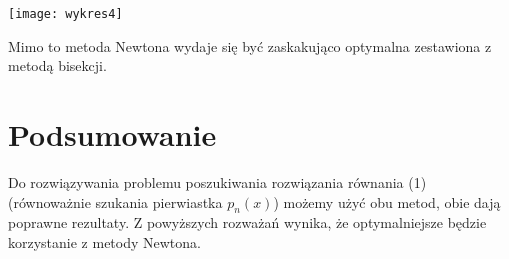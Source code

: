 \documentclass{article}
\begin{document}
\texttt{[image: wykres4]}

Mimo to metoda Newtona wydaje się być zaskakująco optymalna zestawiona z metodą bisekcji.
\section{Podsumowanie}
Do rozwiązywania problemu poszukiwania rozwiązania równania (1) (równoważnie szukania pierwiastka $p_n(x)$) możemy użyć obu metod, obie dają poprawne rezultaty. Z powyższych rozważań wynika, że optymalniejsze będzie korzystanie z metody Newtona.
\end{document}
